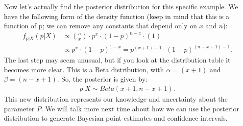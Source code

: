 \documentclass{tufte-handout}
\begin{document}
Now let's actually find the posterior distribution for this specific example.
We have the following form of the density function (keep in mind that this
is a function of p; we can remove any constants that depend only on $x$ and 
$n$):
\begin{align*}
f_{p|X}(p|X) &\propto \binom{n}{x} \cdot p^{x} \cdot (1 - p)^{n-x} \cdot (1) \\
&\propto p^{x} \cdot (1 - p)^{1-x} =p^{(x+1) - 1} \cdot (1 - p)^{(n-x+1) - 1}.
\end{align*}
The last step may seem unusual, but if you look at the distribution table 
it becomes more clear. This is a Beta distribution, with $\alpha = (x+1)$
and $\beta = (n-x+1)$. So, the posterior is given by:
\begin{align*}
p|X \sim Beta(x+1, n-x+1).
\end{align*}
This new distribution represents our knowledge and uncertainty about the
parameter $P$. We will talk more next time about how we can use the posterior
distribution to generate Bayesian point estimates and confidence intervals.
\end{document}
